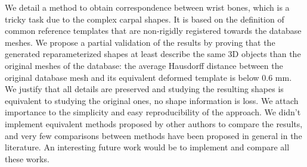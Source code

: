 \documentclass[../../Main.tex]{subfiles}
\begin{document}


We detail a method to obtain correspondence between wrist bones, which is a tricky task due to the complex carpal shapes. It is based on the definition of common reference templates that are non-rigidly registered towards the database meshes. We propose a partial validation of the results by proving that the generated reparameterized shapes at least describe the same 3D objects than the original meshes of the database: the average Hausdorff distance between the original database mesh and its equivalent deformed template is below $0.6$ mm. We justify that all details are preserved and studying the resulting shapes is equivalent to studying the original ones, no shape information is loss. We attach importance to the simplicity and easy reproducibility of the approach. We didn't implement equivalent methods proposed by other authors to compare the results, and very few comparisons between methods have been proposed in general in the literature. An interesting future work would be to implement and compare all these works.
\end{document}
